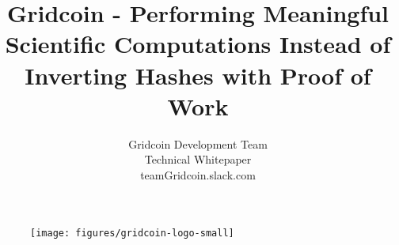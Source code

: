 \documentclass[10pt,a4paper]{article}
\begin{document}
\pagestyle{headings}


\begin{figure}
\centering
\texttt{[image: figures/gridcoin-logo-small]}
\end{figure}


\title{Gridcoin - Performing Meaningful Scientific Computations Instead of Inverting Hashes with Proof of Work}

\author{Gridcoin Development Team\\
Technical Whitepaper\\
teamGridcoin.slack.com\\}


\maketitle



\pagebreak

\tableofcontents





























\newpage






\end{document}
